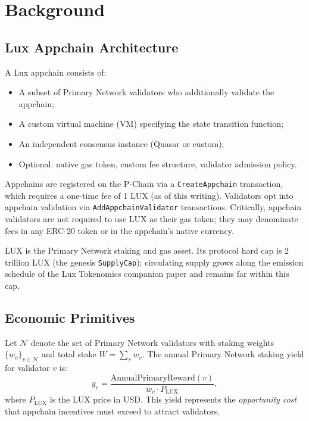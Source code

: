 \section{Background}

\label{sec:background}

\subsection{Lux Appchain Architecture}

A Lux appchain consists of:
\begin{itemize}[leftmargin=1.5em]
  \item A subset of Primary Network validators who additionally validate the appchain;
  \item A custom virtual machine (VM) specifying the state transition function;
  \item An independent consensus instance (Quasar or custom);
  \item Optional: native gas token, custom fee structure, validator admission policy.
\end{itemize}

Appchains are registered on the P-Chain via a \texttt{CreateAppchain} transaction, which
requires a one-time fee of 1 LUX (as of this writing). Validators opt into appchain
validation via \texttt{AddAppchainValidator} transactions. Critically, appchain validators
are not required to use LUX as their gas token; they may denominate fees in any ERC-20
token or in the appchain's native currency.

LUX is the Primary Network staking and gas asset. Its protocol hard cap is
2 trillion LUX (the genesis \texttt{SupplyCap}); circulating supply grows along
the emission schedule of the Lux Tokenomics companion paper and remains far
within this cap.

\subsection{Economic Primitives}

Let $\mathcal{N}$ denote the set of Primary Network validators with staking weights
$\{w_v\}_{v \in \mathcal{N}}$ and total stake $W = \sum_v w_v$. The annual Primary Network
staking yield for validator $v$ is:
\[
  y_v = \frac{\text{AnnualPrimaryReward}(v)}{w_v \cdot P_{\text{LUX}}},
\]
where $P_{\text{LUX}}$ is the LUX price in USD. This yield represents the \emph{opportunity
cost} that appchain incentives must exceed to attract validators.

